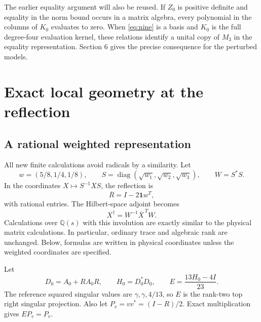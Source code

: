\documentclass[11pt]{article}
\theoremstyle{remark}\newtheorem{remark}[theorem]{Remark}
\newcommand{\Q}{\mathbb Q}
\newcommand{\diag}{\operatorname{diag}}
\begin{document}
The earlier equality argument will also be reused. If $Z_0$ is positive definite and equality in the norm bound occurs in a matrix algebra, every polynomial in the columns of $K_0$ evaluates to zero. When \eqref{eq:nine} is a basis and $K_0$ is the full degree-four evaluation kernel, these relations identify a unital copy of $M_3$ in the equality representation. Section 6 gives the precise consequence for the perturbed models.

\section{Exact local geometry at the reflection}
\subsection{A rational weighted representation}
All new finite calculations avoid radicals by a similarity. Let
\[
 w=(5/8,1/4,1/8),\qquad S=\diag(\sqrt{w_1},\sqrt{w_2},\sqrt{w_3}),\qquad W=S^*S.
\]
In the coordinates $X\mapsto S^{-1}XS$, the reflection is
\[
 \overline R=I-2\mathbf1w^T,
\]
with rational entries. The Hilbert-space adjoint becomes
\[
 X^\dagger=W^{-1}\overline X^{\,T}W.
\]
Calculations over $\Q(s)$ with this involution are exactly similar to the physical matrix calculations. In particular, ordinary trace and algebraic rank are unchanged. Below, formulas are written in physical coordinates unless the weighted coordinates are specified.

Let
\[
 D_0=A_0+RA_0R,\qquad H_0=D_0^*D_0,
 \qquad E=\frac{13H_0-4I}{23}.
\]
The reference squared singular values are $\gamma,\gamma,4/13$, so $E$ is the rank-two top right singular projection. Also let $P_v=vv^*=(I-R)/2$. Exact multiplication gives $EP_v=P_v$.
\end{document}
